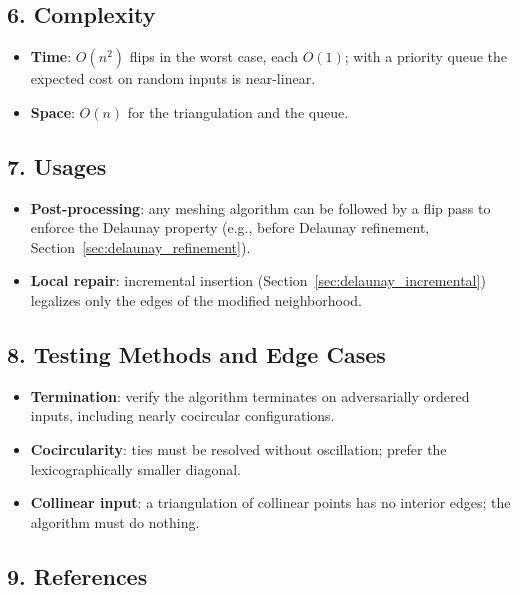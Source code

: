 \subsection{6. Complexity}

\begin{itemize}
\item \textbf{Time}: $O(n^2)$ flips in the worst case, each $O(1)$; with a
  priority queue the expected cost on random inputs is near-linear.
\item \textbf{Space}: $O(n)$ for the triangulation and the queue.
\end{itemize}

\subsection{7. Usages}

\begin{itemize}
\item \textbf{Post-processing}: any meshing algorithm can be followed by a flip
  pass to enforce the Delaunay property (e.g., before Delaunay refinement,
  Section~\ref{sec:delaunay_refinement}).
\item \textbf{Local repair}: incremental insertion (Section~\ref{sec:delaunay_incremental})
  legalizes only the edges of the modified neighborhood.
\end{itemize}

\subsection{8. Testing Methods and Edge Cases}

\begin{itemize}
\item \textbf{Termination}: verify the algorithm terminates on adversarially
  ordered inputs, including nearly cocircular configurations.
\item \textbf{Cocircularity}: ties must be resolved without oscillation;
  prefer the lexicographically smaller diagonal.
\item \textbf{Collinear input}: a triangulation of collinear points has no
  interior edges; the algorithm must do nothing.
\end{itemize}

\subsection{9. References}

